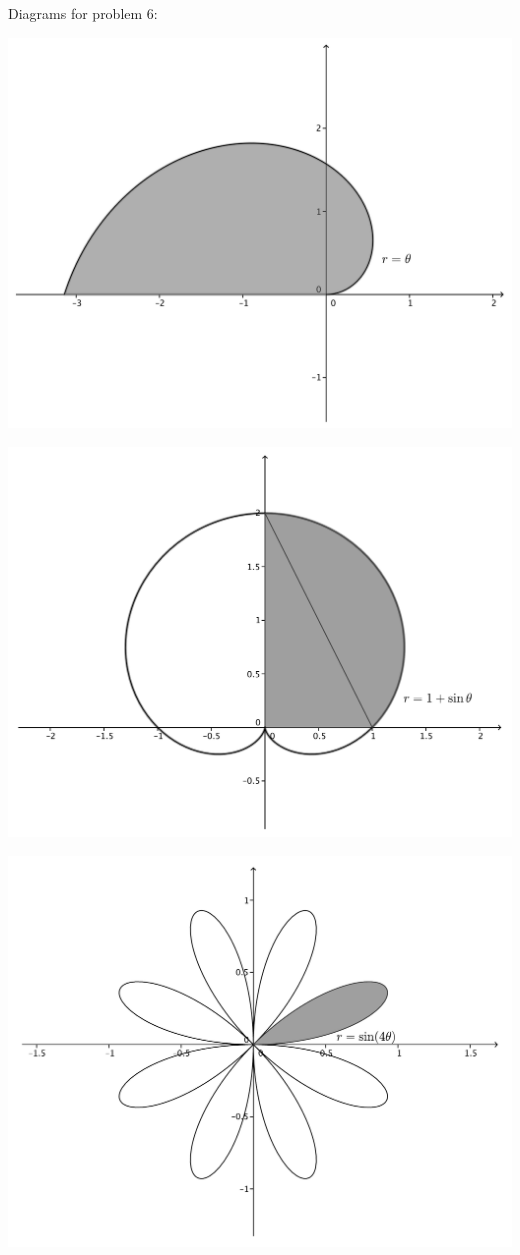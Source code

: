 \documentclass[12pt]{article}
\begin{document}
\begin{enumerate}
Diagrams for problem 6:
\begin{multicols}{2}
 \includegraphics[width=0.9\columnwidth]{WS7-6a}

 \includegraphics[width=0.9\columnwidth]{WS7-6b}

 \includegraphics[width=0.9\columnwidth]{WS7-6c}


\end{multicols}
\end{enumerate}
\end{document}

